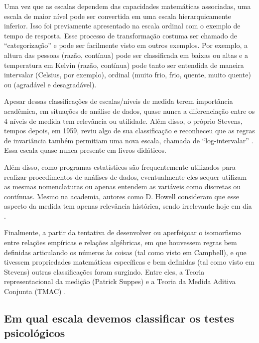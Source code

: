 \documentclass[
]{book}
\begin{document}
Uma vez que as escalas dependem das capacidades matemáticas associadas, uma escala de maior nível pode ser convertida em uma escala hierarquicamente inferior. Isso foi previamente apresentado na escala ordinal com o exemplo de tempo de resposta. Esse processo de transformação costuma ser chamado de ``categorização'' e pode ser facilmente visto em outros exemplos. Por exemplo, a altura das pessoas (razão, contínua) pode ser classificada em baixas ou altas e a temperatura em Kelvin (razão, contínua) pode tanto ser entendida de maneira intervalar (Celsius, por exemplo), ordinal (muito frio, frio, quente, muito quente) ou (agradável e desagradável).

Apesar dessas classificações de escalas/níveis de medida terem importância acadêmica, em situações de análise de dados, quase nunca a diferenciação entre os 4 níveis de medida tem relevância ou utilidade. Além disso, o próprio Stevens, tempos depois, em 1959, reviu algo de sua classificação e reconheceu que as regras de invariância também permitiam uma nova escala, chamada de ``log-intervalar'' \citep{stevens1959}. Essa escala quase nunca presente em livros didáticos.

Além disso, como programas estatísticos são frequentemente utilizados para realizar procedimentos de análises de dados, eventualmente eles sequer utilizam as mesmas nomenclaturas ou apenas entendem as variáveis como discretas ou contínuas. Mesmo na academia, autores como D. Howell consideram que esse aspecto da medida tem apenas relevância histórica, sendo irrelevante hoje em dia \citep[p.~18]{howell2011}.

Finalmente, a partir da tentativa de desenvolver ou aperfeiçoar o isomorfismo entre relações empíricas e relações algébricas, em que houvessem regras bem definidas articulando os números às coisas (tal como visto em Campbell), e que tivessem propriedades matemáticas específicas e bem definidas (tal como visto em Stevens) outras classificações foram surgindo. Entre eles, a Teoria representacional da medição (Patrick Suppes) e a Teoria da Medida Aditiva Conjunta (TMAC) \citep{Michell1993}.

\hypertarget{em-qual-escala-devemos-classificar-os-testes-psicoluxf3gicos}{%
\subsection{Em qual escala devemos classificar os testes psicológicos}\label{em-qual-escala-devemos-classificar-os-testes-psicoluxf3gicos}}
\end{document}
